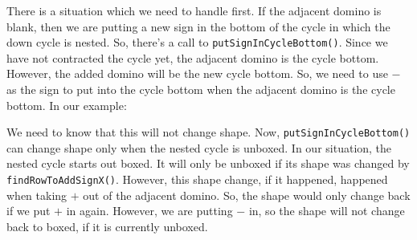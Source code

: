 \documentclass[12pt]{article}
\numberwithin{equation}{section}
\newcommand{\horizontalDominoMaybe}[3]{\filldraw [dominoMaybeStyle] (#2 - 1 + \eps, #1 - 1 + \eps) rectangle + (2 - \teps, 1 -\teps) node [dominoText] {$#3$};}
\newcommand{\verticalDominoMaybeShift}[4]{\filldraw [dominoMaybeStyle] (#2 - 1 + #4 + \eps,  #1 - 1 + \eps) rectangle + (1 - \teps,2 -\teps) node [dominoText] {$#3$};}
\begin{document}
\begin{itemize}
\begin{figure}[H]
    \end{figure}
    There is a situation which we need to handle first.
    If the adjacent domino is blank, then we are putting a new sign in the bottom of the cycle in which the down cycle is nested.
    So, there's a call to \texttt{putSignInCycleBottom()}.
    Since we have not contracted the cycle yet, the adjacent domino is the cycle bottom.
    However, the added domino will be the new cycle bottom.
    So, we need to use $-$ as the sign to put into the cycle bottom when the adjacent domino is the cycle bottom.
    In our example:
    \begin{figure}[H]
      \centering
    \end{figure}

    We need to know that this will not change shape. \linebreak
    Now, \texttt{putSignInCycleBottom()} can change shape only when the nested cycle is unboxed.
    In our situation, the nested cycle starts out boxed.
    It will only be unboxed if its shape was changed by \linebreak \texttt{findRowToAddSignX()}.
    However, this shape change, if it happened, happened when taking $+$ out of the adjacent domino.
    So, the shape would only change back if we put $+$ in again.
    However, we are putting $-$ in, so the shape will not change back to boxed, if it is currently unboxed.


\end{itemize}
\end{document}
